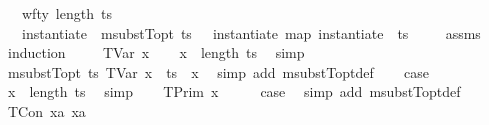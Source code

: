 \begin{isabellebody}
\ \ \ {\isachardoublequoteopen}wf{\isacharunderscore}{\kern0pt}ty\ {\isacharparenleft}{\kern0pt}length\ ts{\isacharparenright}{\kern0pt}\ {\isasymtau}{\isachardoublequoteclose}\isanewline
\ \ \ {\isachardoublequoteopen}instantiate\ {\isasymOmega}\ {\isacharparenleft}{\kern0pt}msubstT{\isacharunderscore}{\kern0pt}opt\ ts\ {\isasymtau}{\isacharparenright}{\kern0pt}\ {\isacharequal}{\kern0pt}\ instantiate\ {\isacharparenleft}{\kern0pt}map\ {\isacharparenleft}{\kern0pt}instantiate\ {\isasymOmega}{\isacharparenright}{\kern0pt}\ ts{\isacharparenright}{\kern0pt}\ {\isasymtau}{\isachardoublequoteclose}\isanewline
%
\isadelimproof
\ \ %
\endisadelimproof
%
\isatagproof
{}\isamarkupfalse%
\ assms\isanewline
{}\isamarkupfalse%
\ {\isacharparenleft}{\kern0pt}induction\ {\isasymtau}{\isacharparenright}{\kern0pt}\isanewline
\ \ \isamarkupfalse%
\ {\isacharparenleft}{\kern0pt}TVar\ x{\isacharparenright}{\kern0pt}\isanewline
\ \ \isamarkupfalse%
\ {\isachardoublequoteopen}x\ {\isacharless}{\kern0pt}\ length\ ts{\isachardoublequoteclose}\ \isamarkupfalse%
\ simp\isanewline
\ \ \isamarkupfalse%
\ {\isachardoublequoteopen}msubstT{\isacharunderscore}{\kern0pt}opt\ ts\ {\isacharparenleft}{\kern0pt}TVar\ x{\isacharparenright}{\kern0pt}\ {\isacharequal}{\kern0pt}\ ts\ {\isacharbang}{\kern0pt}\ x{\isachardoublequoteclose}\ \isamarkupfalse%
\ {\isacharparenleft}{\kern0pt}simp\ add{\isacharcolon}{\kern0pt}\ msubstT{\isacharunderscore}{\kern0pt}opt{\isacharunderscore}{\kern0pt}def{\isacharparenright}{\kern0pt}\isanewline
\ \ \isamarkupfalse%
\ {\isacharquery}{\kern0pt}case\ \isamarkupfalse%
\ {\isacartoucheopen}x\ {\isacharless}{\kern0pt}\ length\ ts{\isacartoucheclose}\ \isamarkupfalse%
\ simp\isanewline
{}\isamarkupfalse%
\isanewline
\ \ \isamarkupfalse%
\ {\isacharparenleft}{\kern0pt}TPrim\ x{\isacharparenright}{\kern0pt}\isanewline
\ \ \isamarkupfalse%
\ \isamarkupfalse%
\ {\isacharquery}{\kern0pt}case\ \isamarkupfalse%
\ {\isacharparenleft}{\kern0pt}simp\ add{\isacharcolon}{\kern0pt}\ msubstT{\isacharunderscore}{\kern0pt}opt{\isacharunderscore}{\kern0pt}def{\isacharparenright}{\kern0pt}\isanewline
{}\isamarkupfalse%
\isanewline
\ \ \isamarkupfalse%
\ {\isacharparenleft}{\kern0pt}TCon\ x{}a\ x{}a{\isacharparenright}{\kern0pt}\isanewline

\end{isabellebody}
